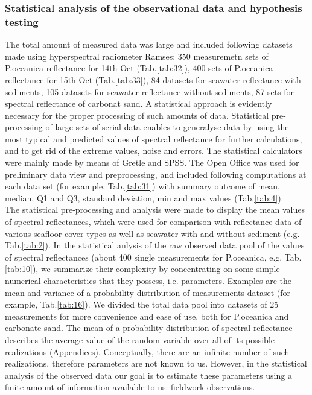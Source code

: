 \documentclass[10pt, a4paper]{article}
\begin{document}
\subsubsection{Statistical analysis of the observational data and hypothesis testing}
The total amount of measured data was large and included following datasets made using
hyperspectral radiometer Ramses: 350 measuremetn sets of P.oceanica reflectance for 14th Oct (Tab.\ref{tab:32}), 400
sets of P.oceanica reflectance for 15th Oct (Tab.\ref{tab:33}), 84 datasets for seawater reflectance with sediments, 105
datasets for seawater reflectance without sediments, 87 sets for spectral reflectance of carbonat sand.
A statistical approach is evidently necessary for the proper processing of such amounts of data. 
Statistical pre-processing of large sets of serial data enables to generalyse data by using the most typical and predicted values of
spectral reflectance for further calculations, and to get rid of the extreme values, noise and errors.
The statistical calculators were mainly made by means of Gretle and SPSS. 
The Open Office was used for preliminary data view and preprocessing, and included following computations
at each data set (for example, Tab.\ref{tab:31}) with summary outcome of mean, median, Q1 and Q3, standard deviation, min and max values (Tab.\ref{tab:4}). \\
The statistical pre-processing and analysis were made to display the mean values of spectral reflectances,
which were used for comparison with reflectance data of various seafloor cover types as well as
seawater with and without sediment (e.g. Tab.\ref{tab:2}).
In the statistical anlysis of the raw observed data pool of the values of spectral reflectances (about 400 single measurements for P.oceanica, e.g. Tab.\ref{tab:10}), we summarize their complexity by concentrating on some simple numerical characteristics that they possess, i.e. parameters. Examples are the mean and variance of a probability distribution of measurements dataset (for example, Tab.\ref{tab:16}). We divided the total data pool into datasets of 25 measurements for more convenience and ease of use, both for P.oceanica and carbonate sand. The mean of a probability distribution of spectral reflectance describes the average value of the random variable over all of its possible realizations (Appendices).  Conceptually, there are an infinite number of such realizations, therefore parameters are not known to us. However, in the statistical analysis of the observed data our goal is to estimate these parameters using a finite amount of information available to us: fieldwork observations. \\
\end{document}

